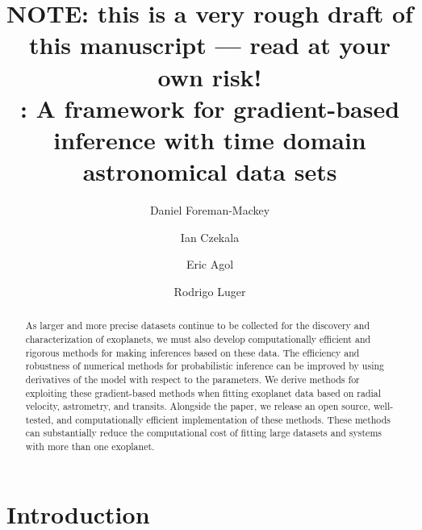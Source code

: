\documentclass[modern]{aastex62}
\begin{document}
\raggedbottom\sloppy\sloppypar\frenchspacing

\title{%
{\bf NOTE: this is a very rough draft of this manuscript --- read at your own risk!}
\\
\exoplanet: A framework for gradient-based inference with time domain astronomical data sets
}

\author[0000-0002-9328-5652]{Daniel Foreman-Mackey}

\author[0000-0002-1483-8811]{Ian Czekala}

\author[0000-0002-0802-9145]{Eric Agol}

\author[0000-0002-0296-3826]{Rodrigo Luger}

\begin{abstract}
\noindent
As larger and more precise datasets continue to be collected for the discovery and characterization of exoplanets, we must also develop computationally efficient and rigorous methods for making inferences based on these data.
The efficiency and robustness of numerical methods for probabilistic inference
can be improved by using derivatives of the model with respect to the
parameters.
We derive methods for exploiting these gradient-based methods
when fitting exoplanet data based on radial velocity, astrometry, and
transits.
Alongside the paper, we release an open source, well-tested, and
computationally efficient implementation of these methods.
These methods can substantially reduce the computational cost of fitting large
datasets and systems with more than one exoplanet.

\end{abstract}


\section{Introduction}
\end{document}
